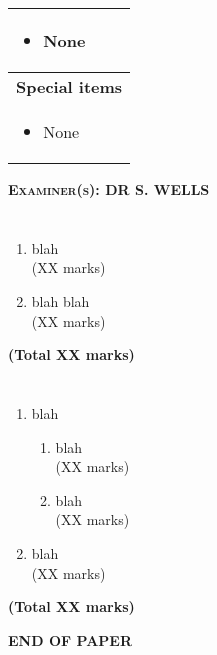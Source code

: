 \documentclass[12pt, a4paper, twosize]{article}
\begin{document}
\begin{titlepage}
\begin{table}[H]
\begin{tabular}{|p{14cm}|}
    \begin{itemize}
      \item None
    \end{itemize} \\[-0.5cm]

\hline
{\bf{Special items}}\\[-0.5cm]

    \begin{itemize}
      \item None
    \end{itemize} \\%

\hline
\end{tabular}
\end{table}

\textsc{ {\bf{Examiner(s): DR S. WELLS}}}

\end{titlepage}


\section{}
\begin{enumerate}
\item blah\\
\hspace*{\fill} (XX marks)
\item blah blah\\
\hspace*{\fill} (XX marks)
\end{enumerate}
\hspace*{\fill} {\bf{(Total XX marks)}}


\section{}
\begin{enumerate}
\item blah\\

    \begin{enumerate}[label=\roman*.]

    \item blah\\
    \hspace*{\fill} (XX marks)

    \item blah\\
    \hspace*{\fill} (XX marks)

    \end{enumerate}

\item blah\\
    \hspace*{\fill} (XX marks)
\end{enumerate}
\hspace*{\fill} {\bf{(Total XX marks)}}



\vspace*{2.5cm}
\centerline{{\bf{END OF PAPER}}}
\end{document}
